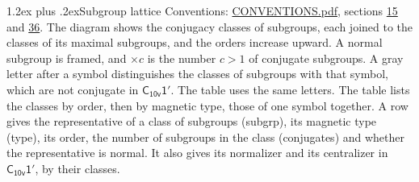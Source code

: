 \documentclass[10pt,a4paper]{article}
\makeatletter
\renewcommand\section{\@startsection{section}{1}{\z@}{-3ex plus -1ex minus -.2ex}%
  {1.2ex plus .2ex}{\normalfont\large\sffamily\bfseries\color{parttitle}}}
\numberwithin{equation}{section}
\newcommand{\grp}[1]{\mathsf{#1}}
\makeatother
\begin{document}
\section{Subgroup lattice}\label{s:subgroups}
Conventions: \href{../../CONVENTIONS.pdf}{CONVENTIONS.pdf}, sections \href{../../../rotation/CONVENTIONS.pdf\#conv.15}{15} and \href{../../CONVENTIONS.pdf\#conv.36}{36}.
The diagram shows the conjugacy classes of subgroups, each joined to the classes of its maximal subgroups, and the orders increase upward. \label{n:index.conjugates.c}\label{n:mark.conjugates}A normal subgroup is framed, and ${\times}c$ is the number $c > 1$ of conjugate subgroups. \label{n:mark.letter}A gray letter after a symbol distinguishes the classes of subgroups with that symbol, which are not conjugate in $\grp{C_{10v}1'}$. The table uses the same letters. The table lists the classes by order, then by magnetic type, those of one symbol together. \label{n:head.subgroup}\label{n:head.magnetic.type}\label{n:head.order}\label{n:head.conjugates}\label{n:head.normal}A row gives the representative of a class of subgroups (subgrp), its magnetic type (type), its order, the number of subgroups in the class (conjugates) and whether the representative is normal. \label{n:head.normalizer}\label{n:head.centralizer}It also gives its normalizer and its centralizer in $\grp{C_{10v}1'}$, by their classes. 
\end{document}
